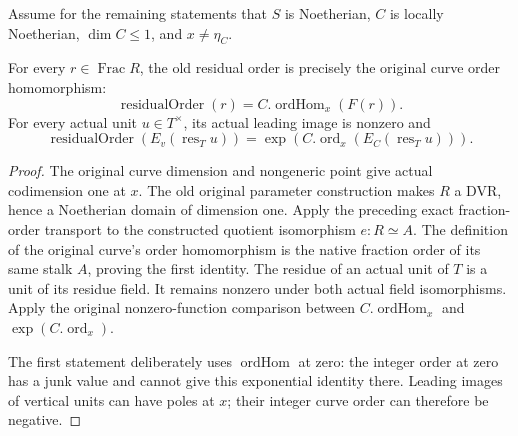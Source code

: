 Assume for the remaining statements that \(S\) is Noetherian, \(C\) is
locally Noetherian, \(\dim C\le1\), and \(x\ne\eta_C\).

\begin{theorem}
\label{thm:central-curve-original-leading-order}
\leanok
For every \(r\in\operatorname{Frac}R\), the old residual order is precisely
the original curve order homomorphism:
\[
 \operatorname{residualOrder}(r)
 = C.\operatorname{ordHom}_x(F(r)).
\]
For every actual unit \(u\in T^\times\), its actual leading image is nonzero
and
\[
 \operatorname{residualOrder}(E_v(\operatorname{res}_T u))
 =\exp\!\left(C.\operatorname{ord}_x(E_C(\operatorname{res}_T u))\right).
\]
\end{theorem}
\begin{proof}
The original curve dimension and nongeneric point give actual codimension
one at \(x\). The old original parameter construction makes \(R\) a DVR,
hence a Noetherian domain of dimension one.
Apply the preceding exact fraction-order transport to the constructed
quotient isomorphism \(e:R\simeq A\).
The definition of the original curve's order homomorphism is the native
fraction order of its same stalk \(A\), proving the first identity.
The residue of an actual unit of \(T\) is a unit of its residue field.
It remains nonzero under both actual field isomorphisms.
Apply the original nonzero-function comparison between
\(C.\operatorname{ordHom}_x\) and \(\exp(C.\operatorname{ord}_x)\).

The first statement deliberately uses \(\operatorname{ordHom}\) at zero:
the integer order at zero has a junk value and cannot give this exponential
identity there. Leading images of vertical units can have poles at \(x\);
their integer curve order can therefore be negative.
\end{proof}

